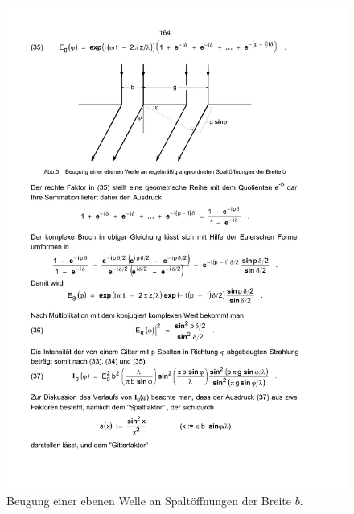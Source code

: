 \begin{figure}
  \centering
  \includegraphics[scale=0.8]{content/gitter.pdf}
\caption{Beugung einer ebenen Welle an Spaltöffnungen der Breite $b$\cite{anleitung605}.}
  \label{fig:gitter}
\end{figure}
